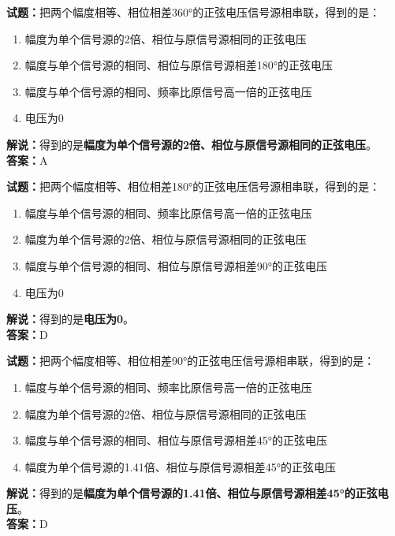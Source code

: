 \documentclass{ctexbook}
\begin{document}
\textbf{试题：}把两个幅度相等、相位相差360°的正弦电压信号源相串联，得到的是：
\begin{enumerate}[leftmargin=3em]
  \item 幅度为单个信号源的2倍、相位与原信号源相同的正弦电压
  \item 幅度与单个信号源的相同、相位与原信号源相差180°的正弦电压
  \item 幅度与单个信号源的相同、频率比原信号高一倍的正弦电压
  \item 电压为0
\end{enumerate}
\noindent\textbf{解说：}得到的是\textbf{幅度为单个信号源的2倍、相位与原信号源相同的正弦电压}。\\\noindent\textbf{答案：}A

\vspace{1em}

\textbf{试题：}把两个幅度相等、相位相差180°的正弦电压信号源相串联，得到的是：
\begin{enumerate}[leftmargin=3em]
  \item 幅度与单个信号源的相同、频率比原信号高一倍的正弦电压
  \item 幅度为单个信号源的2倍、相位与原信号源相同的正弦电压
  \item 幅度与单个信号源的相同、相位与原信号源相差90°的正弦电压
  \item 电压为0
\end{enumerate}
\noindent\textbf{解说：}得到的是\textbf{电压为0}。\\\noindent\textbf{答案：}D

\vspace{1em}

\textbf{试题：}把两个幅度相等、相位相差90°的正弦电压信号源相串联，得到的是：
\begin{enumerate}[leftmargin=3em]
  \item 幅度与单个信号源的相同、频率比原信号高一倍的正弦电压
  \item 幅度为单个信号源的2倍、相位与原信号源相同的正弦电压
  \item 幅度与单个信号源的相同、相位与原信号源相差45°的正弦电压
  \item 幅度为单个信号源的1.41倍、相位与原信号源相差45°的正弦电压
\end{enumerate}
\noindent\textbf{解说：}得到的是\textbf{幅度为单个信号源的1.41倍、相位与原信号源相差45°的正弦电压}。\\\noindent\textbf{答案：}D

\vspace{1em}
\end{document}

